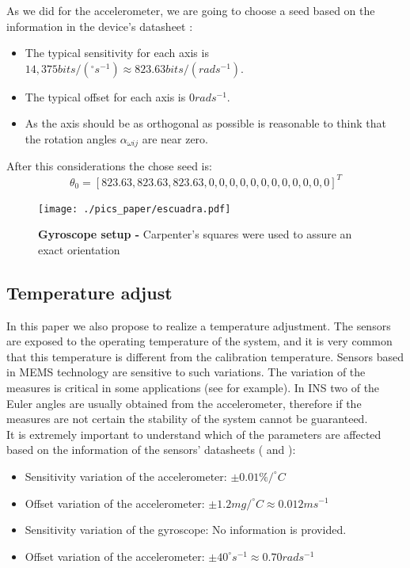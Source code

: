 \documentclass[conference]{IEEEtran}
\begin{document}
As we did for the accelerometer, we are going to choose a seed based on the information in the device's datasheet \cite{bib:gyro_data}: 

\begin{itemize}
\item The typical sensitivity for each axis is $14,375 bits/(^\circ s^{-1})\approx 823.63 bits/(rad s^{-1})$.
\item The typical offset for each axis is $0 rad s^{-1}$.
\item As the axis should be as orthogonal as possible is reasonable to think that the rotation angles $\alpha_{\omega ij}$ are near zero. 
\end{itemize}

After this considerations the chose seed is:
\begin{equation}
{\theta}_0 = [823.63, 823.63, 823.63, 0, 0, 0, 0, 0, 0, 0, 0, 0, 0, 0, 0]^T
\end{equation}

\begin{figure}
	\centering
	\texttt{[image: ./pics\_paper/escuadra.pdf]}
	\caption{\textbf{Gyroscope setup - }Carpenter's squares were used to assure an exact orientation}
	\label{fig:setup_gyro}
\end{figure}


\subsection{Temperature adjust}
\label{sec:param_temp}

In this paper we also propose to realize a temperature adjustment. The sensors are exposed to the operating temperature of the system, and it is very common that this temperature is different from the calibration temperature. Sensors based in MEMS technology are sensitive to such variations. The variation of the measures is critical in some applications (see \cite{bib:uquad} for example). In INS two of the Euler angles are usually obtained from the accelerometer, therefore if the measures are not certain the stability of the system cannot be guaranteed.\\

It is extremely important to understand which of the parameters are affected based on the information of the sensors' datasheets (\cite{bib:acc_data} and \cite{bib:gyro_data}):

\begin{itemize}
\item Sensitivity variation of the accelerometer: $\pm 0.01 \%/^\circ C$
\item Offset variation of the accelerometer: $\pm 1.2mg/^\circ C \approx 0.012m s^{-1}$
\item Sensitivity variation of the gyroscope: No information is provided. 
\item Offset variation of the accelerometer: $\pm 40 ^\circ s^{-1} \approx 0.70 rad s^{-1}$
\end{itemize}
\end{document}

